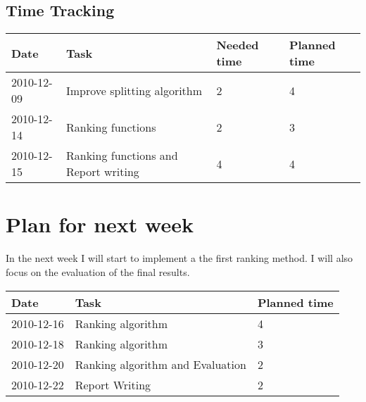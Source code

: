 \documentclass[11pt, accentcolor=tud9b, nochapname]{tudexercise}
\begin{document}
\subsection{Time Tracking}

\begin{tabular}{l | l | l | l}
  \hline
  \textbf{Date} & \textbf{Task} & \textbf{Needed time} & \textbf{Planned time} \\ \hline
  2010-12-09 & Improve splitting algorithm & 2 & 4 \\ \hline
  2010-12-14 & Ranking functions & 2 & 3 \\ \hline
  2010-12-15 & Ranking functions and Report writing & 4 & 4  \\ \hline
\end{tabular}

\section{Plan for next week}
In the next week I will start to implement a the first ranking method. I will also focus on the evaluation of the final results.

\vspace{10pt}
\begin{tabular}{l | l | l}
  \hline
  \textbf{Date} & \textbf{Task} & \textbf{Planned time} \\ \hline
  2010-12-16 & Ranking algorithm & 4 \\ \hline
  2010-12-18 & Ranking algorithm & 3 \\ \hline
  2010-12-20 & Ranking algorithm and Evaluation & 2 \\ \hline
  2010-12-22 & Report Writing & 2 \\ \hline
\end{tabular}



\end{document}
